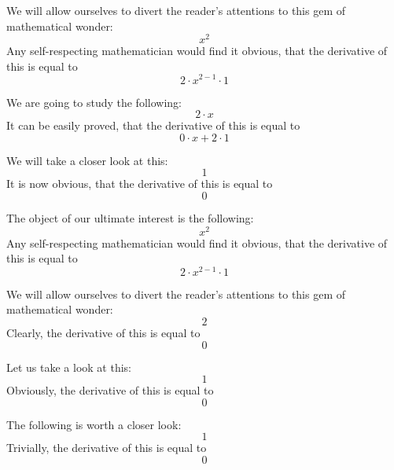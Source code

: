 \documentclass{article}
\begin{document}
We will allow ourselves to divert the reader's attentions to this gem of mathematical wonder:
\begin{equation}
x ^{2 } 
\end{equation}
Any self-respecting mathematician would find it obvious, that the derivative of this is equal to
\begin{equation}
2 \cdot x ^{2 - 1 } \cdot 1 
\end{equation}

We are going to study the following:
\begin{equation}
2 \cdot x 
\end{equation}
It can be easily proved, that the derivative of this is equal to
\begin{equation}
0 \cdot x + 2 \cdot 1 
\end{equation}

We will take a closer look at this:
\begin{equation}
1 
\end{equation}
It is now obvious, that the derivative of this is equal to
\begin{equation}
0 
\end{equation}

The object of our ultimate interest is the following:
\begin{equation}
x ^{2 } 
\end{equation}
Any self-respecting mathematician would find it obvious, that the derivative of this is equal to
\begin{equation}
2 \cdot x ^{2 - 1 } \cdot 1 
\end{equation}

We will allow ourselves to divert the reader's attentions to this gem of mathematical wonder:
\begin{equation}
2 
\end{equation}
Clearly, the derivative of this is equal to
\begin{equation}
0 
\end{equation}

Let us take a look at this:
\begin{equation}
1 
\end{equation}
Obviously, the derivative of this is equal to
\begin{equation}
0 
\end{equation}

The following is worth a closer look:
\begin{equation}
1 
\end{equation}
Trivially, the derivative of this is equal to
\begin{equation}
0 
\end{equation}
\end{document}
